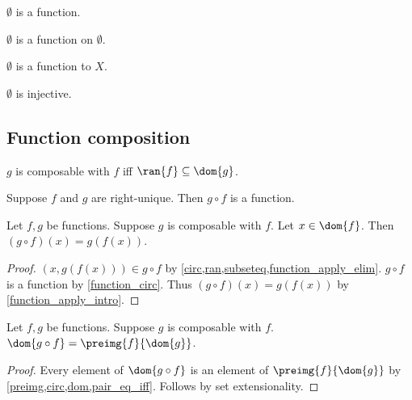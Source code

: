 \begin{proposition}\label{emptyset_is_function}
    $\emptyset$ is a function.
\end{proposition}

\begin{proposition}\label{emptyset_is_function_on_emptyset}
    $\emptyset$ is a function on $\emptyset$.
\end{proposition}

\begin{proposition}\label{codom_of_emptyset_can_be_anything}
    $\emptyset$ is a function to $X$.
\end{proposition}

\begin{proposition}\label{emptyset_is_injective}
    $\emptyset$ is injective.
\end{proposition}


\subsection{Function composition}

\begin{abbreviation}\label{composable}
    $g$ is composable with $f$ iff $\ran{f}\subseteq \dom{g}$.
\end{abbreviation}

\begin{proposition}\label{function_circ}
    Suppose $f$ and $g$ are right-unique.
    Then $g\circ f$ is a function.
\end{proposition}

\begin{proposition}\label{circ_apply}
    Let $f, g$ be functions.
    Suppose $g$ is composable with $f$.
    Let $x\in\dom{f}$.
    Then $(g\circ f)(x) = g(f(x))$.
\end{proposition}
\begin{proof}
    $(x, g(f(x)))\in g\circ f$ by \cref{circ,ran,subseteq,function_apply_elim}.
    $g\circ f$ is a function by \cref{function_circ}.
    Thus $(g\circ f)(x) = g(f(x))$ by \cref{function_apply_intro}.
\end{proof}

\begin{proposition}\label{dom_of_circ}
    Let $f, g$ be functions.
    Suppose $g$ is composable with $f$.
    $\dom{g\circ f} = \preimg{f}{\dom{g}}$.
\end{proposition}
\begin{proof}
    Every element of $\dom{g\circ f}$ is an element of $\preimg{f}{\dom{g}}$
        by \cref{preimg,circ,dom,pair_eq_iff}.
    Follows by set extensionality.
\end{proof}

